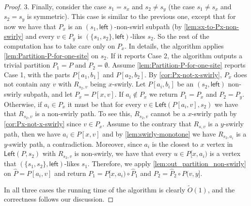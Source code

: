 \documentclass{article}
\newcommand{\Left}{\mathsf{Left}}
\newcommand{\leftside}{\mathsf{left}}
\newcommand{\Otild}{\tilde{O}}
\begin{document}
\begin{proof}
3. Finally, consider the case $s_1=s_x$ and $s_2\ne s_y$ (the case $s_1\ne s_x$ and $s_2=s_y$ is symmetric).
This case is similar to the previous one, except that for now we have that $P_x$ is an $(s_1,\leftside)$-non-swirl subpath (by \cref{lem:sx-to-Px-non-swirly} and every $v\in P_y$ is $(\{s_1,s_2\},\leftside)$-likes $s_2$.
So the rest of the computation has to take care only on $P_x$.
In details, the algorithm applies \cref{lem:Partition-P-for-one-site} on $s_2$.
If it reports Case 2, the algorithm outputs a trivial partition $P_1=P$ and $P_2=\emptyset$.
Assume \cref{lem:Partition-P-for-one-site} reports Case 1, with the parts $P[a_1,b_1]$ and $P[a_2,b_2]$.
By \cref{cor:Px-not-x-swirly}, $P_x$ does not contain any $v$ with $R_{s_2,v}$ being $x$-swirly.
Let $P[a_i,b_i]$ be an $(s_2,\leftside)$ non-swirly subpath, and let $P_x=P[x,v]$.
If $a_i\notin P_x$ we return $P_1=P_x$ and $P_2=P_y$.
Otherwise, if $a_i\in P_x$ it must be that for every $v\in\Left(P[a_i,v],s_2)$ we have that $R_{s_2,v}$ is a non-swirly path.
To see this, $R_{s_2,v}$ cannot be a $x$-swirly path by \cref{cor:Px-not-x-swirly} since $v\in P_x$.
Assume to the contrary that $R_{s,v}$ is a $y$-swirly path, then we have $a_i\in P[x,v]$ and  by \cref{lem:swirly-monotone} we have $R_{s_2,a_i}$ is a $y$-swirly path, a contradiction.
Moreover, since $a_i$ is the closest to $x$ vertex in $\Left(P,s_2)$ with $R_{s_2,v}$ is non-swirly, we have that every $u\in P[x,a_i)$ is a vertex that $(\{s_1,s_2\},\leftside)$-likes $s_1$.
Therefore, we apply \cref{lem:out_partition_non-swirly} on $\hat P=P[a_i,v]$ and return $P_1=P[x,a_i)\circ \hat P_1$ and $P_2=\hat P_2\circ P(v,y]$.


In all three cases the running time of the algorithm is clearly $\Otild(1)$, and the correctness follows our discussion.
\end{proof}
\end{document}
